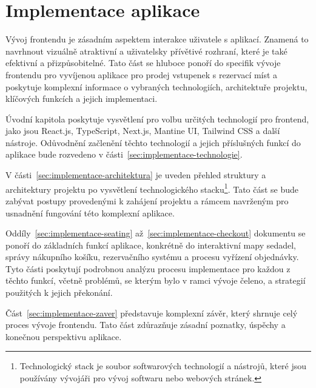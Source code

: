 \chapter{Implementace aplikace}
\label{ch:implementace}
Vývoj frontendu je zásadním aspektem interakce uživatele s aplikací.
Znamená to navrhnout vizuálně atraktivní a uživatelsky přívětivé rozhraní, které je také efektivní a přizpůsobitelné.
Tato část se hluboce ponoří do specifik vývoje frontendu pro vyvíjenou aplikace pro prodej vstupenek s rezervací míst a poskytuje komplexní informace o vybraných technologiích, architektuře projektu, klíčových funkcích a jejich implementaci.

Úvodní kapitola poskytuje vysvětlení pro volbu určitých technologií pro frontend, jako jsou React.js, TypeScript, Next.js, Mantine UI, Tailwind CSS a další nástroje.
Odůvodnění začlenění těchto technologií a jejich příslušných funkcí do aplikace bude rozvedeno v části~\ref{sec:implementace-technologie}.

V části~\ref{sec:implementace-architektura} je uveden přehled struktury a architektury projektu po vysvětlení technologického stacku\footnote{Technologický stack je soubor softwarových technologií a nástrojů, které jsou používány vývojáři pro vývoj softwaru nebo webových stránek.}.
Tato část se bude zabývat postupy provedenými k zahájení projektu a rámcem navrženým pro usnadnění fungování této komplexní aplikace.

Oddíly~\ref{sec:implementace-seating} až~\ref{sec:implementace-checkout} dokumentu se ponoří do základních funkcí aplikace, konkrétně do interaktivní mapy sedadel, správy nákupního košíku, rezervačního systému a procesu vyřízení objednávky.
Tyto části poskytují podrobnou analýzu procesu implementace pro každou z těchto funkcí, včetně problémů, se kterým bylo v ramci vývoje čeleno, a strategií použitých k jejich překonání.

Část~\ref{sec:implementace-zaver} představuje komplexní závěr, který shrnuje celý proces vývoje frontendu.
Tato část zdůrazňuje zásadní poznatky, úspěchy a konečnou perspektivu aplikace.
